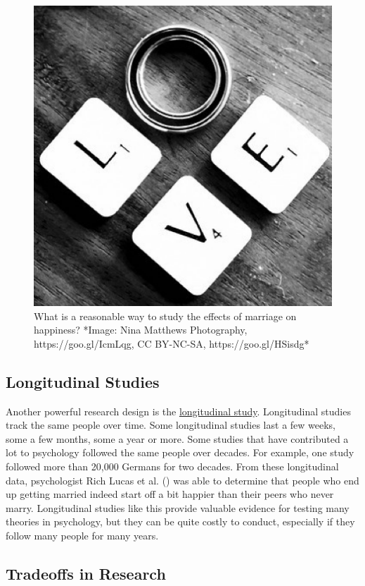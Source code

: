 \documentclass[
]{krantz}
\begin{document}
\begin{figure}

{\centering \includegraphics[width=0.4\linewidth]{images/ch1/love} 

}

\caption{What is a reasonable way to study the effects of marriage on happiness? *Image: Nina Matthews Photography, https://goo.gl/IcmLqg, CC BY-NC-SA, https://goo.gl/HSisdg*}\label{fig:love}
\end{figure}

\subsection*{Longitudinal Studies}\label{longitudinal-studies}


Another powerful research design is the \hyperref[longitudinal-study]{longitudinal study}. Longitudinal studies track the same people over time. Some longitudinal studies last a few weeks, some a few months, some a year or more. Some studies that have contributed a lot to psychology followed the same people over decades. For example, one study followed more than 20,000 Germans for two decades. From these longitudinal data, psychologist Rich Lucas et al. () was able to determine that people who end up getting married indeed start off a bit happier than their peers who never marry. Longitudinal studies like this provide valuable evidence for testing many theories in psychology, but they can be quite costly to conduct, especially if they follow many people for many years.

\subsection*{Tradeoffs in Research}\label{tradeoffs-in-research}
\end{document}
